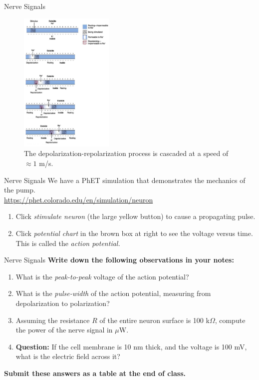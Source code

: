 \documentclass{beamer}
\begin{document}
\begin{frame}{Nerve Signals}
\begin{figure}
\centering
\includegraphics[width=0.4\textwidth]{figures/stim.png}
\caption{\label{fig:nerve2a} The depolarization-repolarization process is cascaded at a speed of $\approx 1$ m/s.}
\end{figure}
\end{frame}

\begin{frame}{Nerve Signals}
We have a PhET simulation that demonstrates the mechanics of the pump. \\ \vspace{1cm}
\url{https://phet.colorado.edu/en/simulation/neuron}
\begin{enumerate}
\item Click \textit{stimulate neuron} (the large yellow button) to cause a propagating pulse.
\item Click \textit{potential chart} in the brown box at right to see the voltage versus time.  This is called the \textit{action potential.}
\end{enumerate}
\end{frame}

\begin{frame}{Nerve Signals}
\textbf{Write down the following observations in your notes:}
\begin{enumerate}
\item What is the \textit{peak-to-peak} voltage of the action potential?
\item What is the \textit{pulse-width} of the action potential, measuring from depolarization to polarization?
\item Assuming the resistance $R$ of the entire neuron surface is 100 k$\Omega$, compute the power of the nerve signal in $\mu$W.
\item \textbf{Question:} If the cell membrane is 10 nm thick, and the voltage is 100 mV, what is the electric field across it?
\end{enumerate}
\textbf{Submit these answers as a table at the end of class.}
\end{frame}
\end{document}
